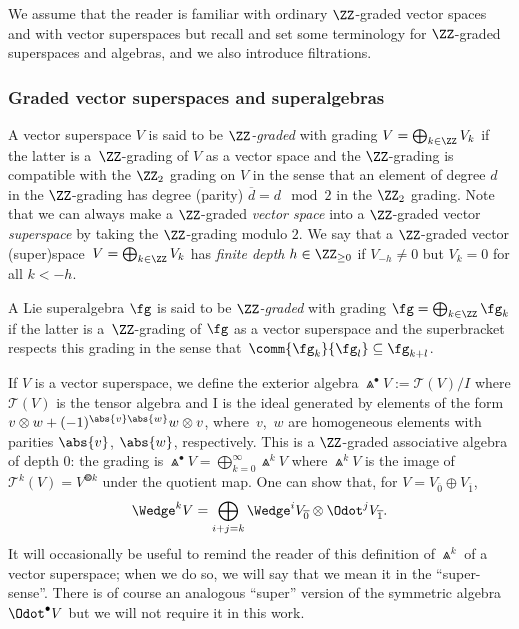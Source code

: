 We assume that the reader is familiar with ordinary $\ZZ$-graded vector spaces and with vector superspaces but recall and set some terminology for $\ZZ$-graded superspaces and algebras, and we also introduce filtrations.

\subsubsection{Graded vector superspaces and superalgebras}
\label{sec:graded-superalg}

A vector superspace $V$ is said to be \emph{$\ZZ$-graded} with grading $V=\bigoplus_{k\in\ZZ}V_k$ if the latter is a~$\ZZ$-grading of $V$ as a vector space and the $\ZZ$-grading is compatible with the $\ZZ_2$ grading on $V$ in the sense that an element of degree $d$ in the $\ZZ$-grading has degree (parity) $\overline{d}=d\mod 2$ in the $\ZZ_2$ grading. Note that we can always make a $\ZZ$-graded \emph{vector space} into a $\ZZ$-graded vector \emph{superspace} by taking the $\ZZ$-grading modulo $2$. We say that a $\ZZ$-graded vector (super)space~${V=\bigoplus_{k\in\ZZ}V_k}$ has \emph{finite depth} $h\in\ZZ_{\geq 0}$ if $V_{-h}\neq 0$ but $V_k=0$ for all $k<-h$.

A Lie superalgebra $\fg$ is said to be \emph{$\ZZ$-graded} with grading $\fg=\bigoplus_{k\in\ZZ}\fg_k$ if the latter is a~$\ZZ$-grading of $\fg$ as a vector superspace and the superbracket respects this grading in the sense that~${\comm{\fg_k}{\fg_l}\subseteq\fg_{k+l}}$.

If $V$ is a vector superspace, we define the exterior algebra $\Wedge^\bullet V:=\mathcal{T}(V)/I$ where $\mathcal{T}(V)$ is the tensor algebra and I is the ideal generated by elements of the form $v\otimes w + (-1)^{\abs{v}\abs{w}}w\otimes v$, where~$v$,~$w$ are homogeneous elements with parities $\abs{v}$, $\abs{w}$, respectively. This is a $\ZZ$-graded associative algebra of depth 0: the grading is $\Wedge^\bullet V = \bigoplus_{k=0}^\infty \Wedge^k V$ where $\Wedge^k V$ is the image of~${\mathcal{T}^k(V)= V^{\Otimes k}}$ under the quotient map. One can show that, for $V=V_{\overline{0}}\oplus V_{\overline{1}}$,
\begin{equation}\label{eq:super-wedge}
	\Wedge^k V = \bigoplus_{i+j=k}\Wedge^i V_{\overline{0}}\otimes\Odot^j V_{\overline{1}}.
\end{equation}
It will occasionally be useful to remind the reader of this definition of $\Wedge^k$ of a vector superspace; when we do so, we will say that we mean it in the ``super-sense''. There is of course an analogous ``super'' version of the symmetric algebra $\Odot^\bullet V$ but we will not require it in this work.

